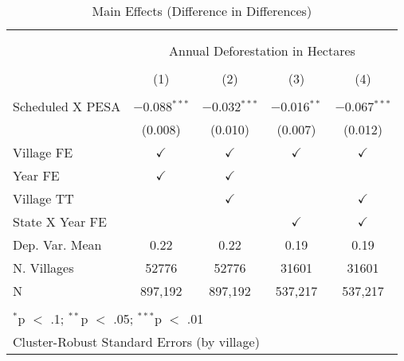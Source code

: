 
\begin{table}[!htbp] \centering 
  \caption{Main Effects (Difference in Differences)} 
  \label{table:regres} 
\begin{tabular}{@{\extracolsep{0pt}}lcccc} 
\\[-1.8ex]\hline \\[-1.8ex] 
\\[-1.8ex] & \multicolumn{4}{c}{Annual Deforestation in Hectares} \\ 
\\[-1.8ex] & (1) & (2) & (3) & (4)\\ 
\hline \\[-1.8ex] 
 Scheduled X PESA & $-$0.088$^{***}$ & $-$0.032$^{***}$ & $-$0.016$^{**}$ & $-$0.067$^{***}$ \\ 
  & (0.008) & (0.010) & (0.007) & (0.012) \\ 
 Village FE & $\checkmark$ & $\checkmark$ & $\checkmark$ & $\checkmark$ \\ 
Year FE & $\checkmark$ & $\checkmark$ &  &  \\ 
Village TT &  & $\checkmark$ &  & $\checkmark$ \\ 
State X Year FE &  &  & $\checkmark$ & $\checkmark$ \\ 
Dep. Var. Mean & 0.22 & 0.22 & 0.19 & 0.19 \\ 
N. Villages & 52776 & 52776 & 31601 & 31601 \\ 
N & 897,192 & 897,192 & 537,217 & 537,217 \\ 
\hline \\[-1.8ex] 
\multicolumn{5}{l}{$^{*}$p $<$ .1; $^{**}$p $<$ .05; $^{***}$p $<$ .01} \\ 
\multicolumn{5}{l}{Cluster-Robust Standard Errors (by village)} \\ 
\end{tabular} 
\end{table} 
